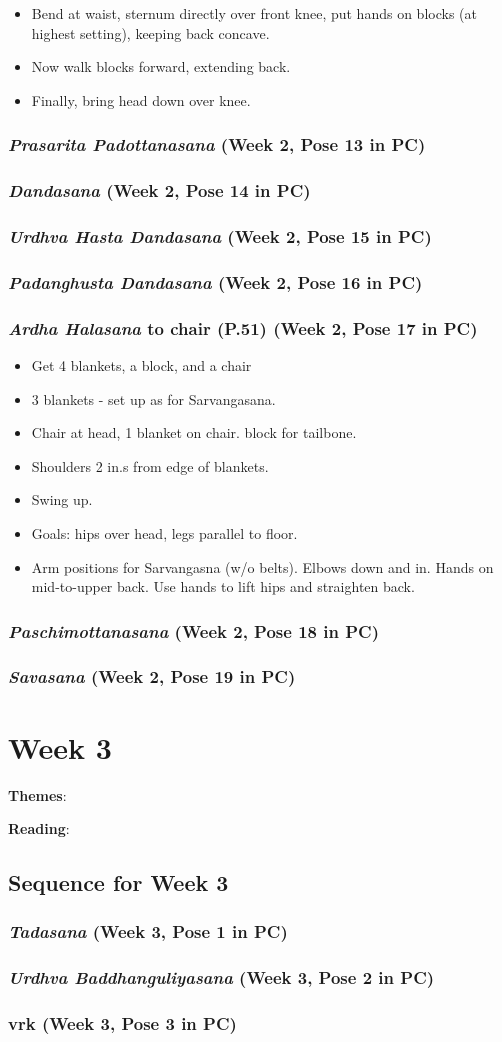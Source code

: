 \documentclass{book}
\newcommand{\apose}[1]{\emph{#1}}
\newcommand{\ardhal}{\apose{Ardha Halasana}}
\newcommand{\dand}{\apose{Dandasana}}
\newcommand{\padadand}{\apose{Padanghusta Dandasana}}
\newcommand{\paschi}{\apose{Paschimottanasana}}
\newcommand{\praspad}{\apose{Prasarita Padottanasana}}
\newcommand{\sav}{\apose{Savasana}}
\newcommand{\tad}{\apose{Tadasana}}
\newcommand{\urdbad}{\apose{Urdhva Baddhanguliyasana}}
\newcommand{\urdhastdand}{\apose{Urdhva Hasta Dandasana}}
\newcommand{\PC}[2]{{\normalfont \hfill(Week #1, Pose #2 in PC)}}
\newcommand{\newpose}[1]{{{#1}}}
\newcounter{week}
\newcounter{pose}
\newcommand{\week}[1]
{ \IfDecimal{#1}{\setcounter{week}{\integerpart}}{fooey}
  \setcounter{pose}{1}
  \chapter{Week {#1}}}
\newcommand{\pose}{\subsection}
\begin{document}
  \begin{itemize}
  \item Bend at waist, sternum directly over front knee, put hands on
    blocks (at highest setting), keeping back concave.
  \item Now walk blocks forward, extending back.
  \item Finally, bring head down over knee. 
  \end{itemize}

\pose{ \praspad{} \PC{2}{13}}

\pose{ \dand{} \PC{2}{14}}

\pose{ \urdhastdand{} \PC{2}{15}}

\pose{ \padadand{} \PC{2}{16}}

\pose{ \newpose{\ardhal} to chair (P.51) \PC{2}{17}}
  \begin{itemize}
  \item Get 4 blankets, a block, and a chair
  \item 3 blankets - set up as for Sarvangasana. 
  \item Chair at head, 1 blanket on chair. block for tailbone.
  \item Shoulders 2 in.s from edge of blankets.
  \item Swing up.
  \item Goals: hips over head, legs parallel to floor.
  \item Arm positions for Sarvangasna (w/o belts). Elbows down and
    in. Hands on mid-to-upper back. Use hands to lift hips and
    straighten back.
  \end{itemize}

\pose{ \paschi{} \PC{2}{18}}

\pose{ \sav{} \PC{2}{19}}
  

\week{3}
\label{week:3}

\textbf{Themes}: 

\textbf{Reading}: 

\section{Sequence for Week 3}
\label{seq:3}

\pose{ \tad{} \PC{3}{1}}

\pose{ \urdbad{} \PC{3}{2}}

\pose{ \newpose{vrk{}} \PC{3}{3}}
\end{document}
